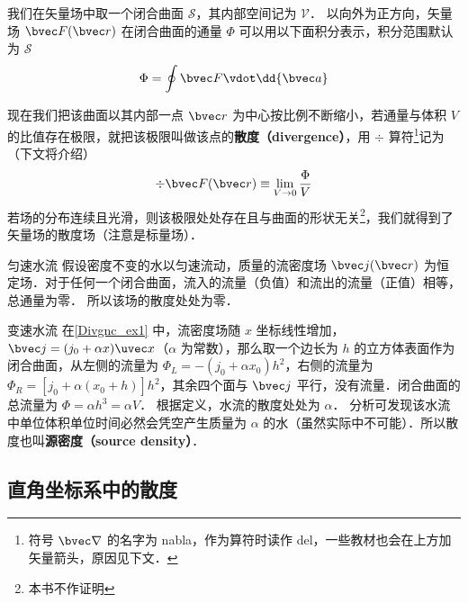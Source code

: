 

我们在矢量场中取一个闭合曲面 $\mathcal{S}$，其内部空间记为 $\mathcal{V}$． 以向外为正方向，矢量场 $\bvec F(\bvec r)$ 在闭合曲面的通量 $\Phi$ 可以用以下面积分表示，积分范围默认为 $\mathcal{S}$
\begin{equation}\label{Divgnc_eq1}
\Phi  = \oint \bvec F \vdot \dd{\bvec a}
\end{equation}

现在我们把该曲面以其内部一点 $\bvec r$ 为中心按比例不断缩小，若通量与体积 $V$ 的比值存在极限，就把该极限叫做该点的\textbf{散度（divergence）}，用 $\div$ 算符\footnote{符号 $\bvec\nabla$ 的名字为 nabla，作为算符时读作 del，一些教材也会在上方加矢量箭头，原因见下文．}记为（下文将介绍）
\begin{equation}\label{Divgnc_eq2}
\div \bvec F(\bvec r) \equiv \lim_{V \to 0} \frac{\Phi }{V}
\end{equation}
若场的分布连续且光滑，则该极限处处存在且与曲面的形状无关\footnote{本书不作证明}，我们就得到了矢量场的散度场（注意是标量场）．

\begin{example}{匀速水流}\label{Divgnc_ex1}
假设密度不变的水以匀速流动，质量的流密度场 $\bvec j(\bvec r)$ 为恒定场．对于任何一个闭合曲面，流入的流量（负值）和流出的流量（正值）相等，总通量为零． 所以该场的散度处处为零．
\end{example}

\begin{example}{变速水流}
在\autoref{Divgnc_ex1} 中，流密度场随 $x$ 坐标线性增加， $\bvec j = (j_0 + \alpha x)\uvec x$（$\alpha$ 为常数），那么取一个边长为 $h$ 的立方体表面作为闭合曲面，从左侧的流量为 $\Phi_L =  - (j_0 + \alpha x_0) h^2$，右侧的流量为 $\Phi_R = [j_0 + \alpha (x_0 + h)] h^2$，其余四个面与 $\bvec j$ 平行，没有流量．闭合曲面的总流量为 $\Phi  = \alpha h^3 = \alpha V$． 根据定义，水流的散度处处为 $\alpha$． 分析可发现该水流中单位体积单位时间必然会凭空产生质量为 $\alpha$ 的水（虽然实际中不可能）．所以散度也叫\textbf{源密度（source density）}．
\end{example}

\subsection{直角坐标系中的散度}

